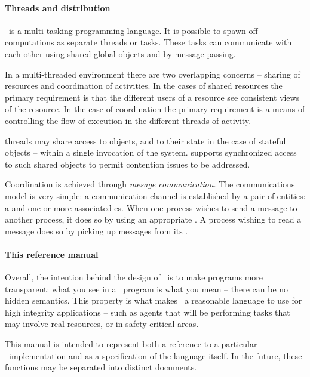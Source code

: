 \paragraph{Threads and distribution}
\go\ is a multi-tasking programming language. It is possible to spawn off computations as separate threads or tasks. These tasks can communicate with each other using shared global objects and by message passing.  

In a multi-threaded environment there are two overlapping concerns -- sharing of resources and coordination of activities. In the cases of shared resources the primary requirement is that the different users of a resource see consistent views of the resource. In the case of coordination the primary requirement is a means of controlling the flow of execution in the different threads of activity.

\go threads may share access to objects, and to their state in the case of stateful objects -- within a single invocation of the system. \go supports synchronized access to such shared objects to permit contention issues to be addressed.

Coordination is achieved through \emph{mesage communication}. The communications model is very simple: a communication channel is established by a pair of entities: a  and one or more associated es. When one process wishes to send a message to another process, it does so by using an appropriate . A process wishing to read a message does so by picking up messages from its .

\paragraph{This reference manual}
Overall, the intention behind the design of \go\ is to make programs more transparent: what you see in a \go\ program is what you mean -- there can be no hidden semantics. This property is what makes \go\ a reasonable language to use for high integrity applications -- such as agents that will be performing tasks that may involve real resources, or in safety critical areas.

This manual is intended to represent both a reference to a particular \go\ implementation and as a specification of the language itself. In the future, these functions may be separated into distinct documents.

